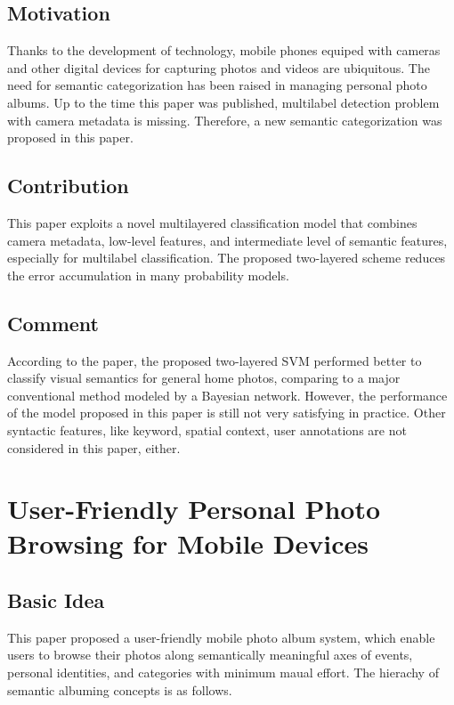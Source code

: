 \documentclass[a4paper]{article}
\begin{document}
        \subsection{Motivation}
        Thanks to the development of technology, mobile phones equiped with cameras and other digital devices for capturing photos and videos are ubiquitous. The need for semantic categorization has been raised in managing personal photo albums. Up to the time this paper was published, multilabel detection problem with camera metadata is missing. Therefore, a new semantic categorization was proposed in this paper.
        \subsection{Contribution}
        This paper exploits a novel multilayered classification model that combines camera metadata, low-level features, and intermediate level of semantic features, especially for multilabel classification. The proposed two-layered scheme reduces the error accumulation in many probability models.
        \subsection{Comment}
        According to the paper, the proposed two-layered SVM performed better to classify visual semantics for general home photos, comparing to a major conventional method modeled by a Bayesian network. However, the performance of the model proposed in this paper is still not very satisfying in practice. Other syntactic features, like keyword, spatial context, user annotations are not considered in this paper, either.
        

    \section{User-Friendly Personal Photo Browsing for Mobile Devices}
        \subsection{Basic Idea}
        This paper proposed a user-friendly mobile photo album system, which enable users to browse their photos along semantically meaningful axes of events, personal identities, and categories with minimum maual effort. The hierachy of semantic albuming concepts is as follows.
\end{document}
